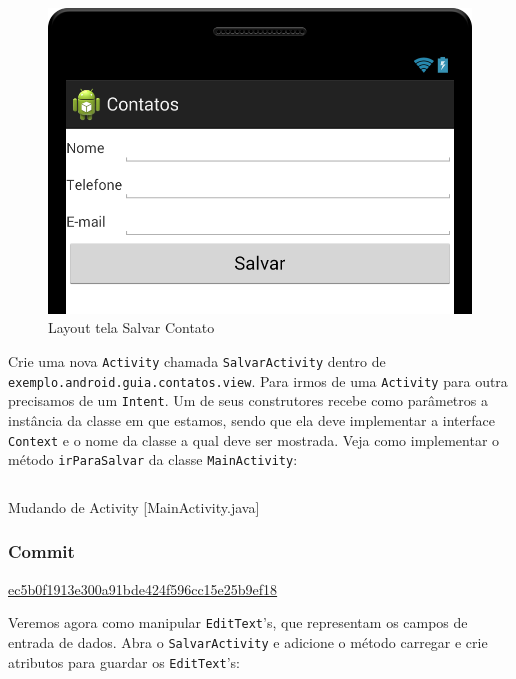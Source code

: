 \begin{figure}[H]
    \center
    \includegraphics[scale=0.3]{img/exemplo-pratico/activity_salvar-1.png}
    \caption{Layout tela Salvar Contato}
\end{figure}

Crie uma nova \texttt{Activity} chamada \texttt{SalvarActivity} dentro
de \texttt{exemplo.android.guia.contatos.view}. Para irmos de uma
\texttt{Activity} para outra precisamos de um \texttt{Intent}. Um de
seus construtores recebe como parâmetros a instância da classe em que
estamos, sendo que ela deve implementar a interface \texttt{Context} e o
nome da classe a qual deve ser mostrada. Veja como implementar o método
\texttt{irParaSalvar} da classe \texttt{MainActivity}:

\begin{listing}[H]
  \inputminted[linenos=true,frame=bottomline,tabsize=3]{ java }{ source/MainActivity-3.java }
  \caption{Mudando de Activity [MainActivity.java]}
\end{listing}

\subsubsection{Commit}

\href{https://github.com/atilacamurca/guia-aberto-android-contatos/commit/ec5b0f1913e300a91bde424f596cc15e25b9ef18}{ec5b0f1913e300a91bde424f596cc15e25b9ef18}

\medskip

Veremos agora como manipular \texttt{EditText}'s, que representam os
campos de entrada de dados. Abra o \texttt{SalvarActivity} e adicione o
método carregar e crie atributos para guardar os \texttt{EditText}'s:

